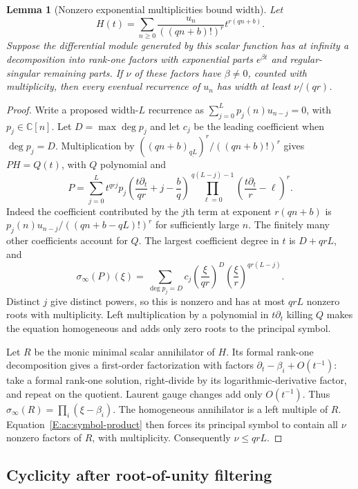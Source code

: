 \documentclass[11pt,a4paper]{article}
\newtheorem{lemma}[theorem]{Lemma}
\theoremstyle{definition}
\theoremstyle{remark}
\numberwithin{equation}{section}
\begin{document}
\begin{lemma}[Nonzero exponential multiplicities bound width]
\label{E:ac:budget}
Let
\[
 H(t)=\sum_{n\ge0}\frac{u_n}{((qn+b)!)^r}t^{r(qn+b)}.
\]
Suppose the differential module generated by this scalar function has
at infinity a decomposition into rank-one factors with exponential
parts $e^{\beta t}$ and regular-singular remaining parts. If $\nu$
of these factors have $\beta\ne0$, counted with multiplicity, then
every eventual recurrence of $u_n$ has width at least $\nu/(qr)$.
\end{lemma}
\begin{proof}
Write a proposed width-$L$ recurrence as
$\sum_{j=0}^L p_j(n)u_{n-j}=0$, with $p_j\in\mathbb C[n]$.
Let $D=\max\deg p_j$ and let $c_j$ be the leading coefficient when
$\deg p_j=D$. Multiplication by
$((qn+b)_{\underline{qL}})^r/((qn+b)!)^r$ gives
$PH=Q(t)$, with $Q$ polynomial and
\[
 P=\sum_{j=0}^L t^{qrj}
 p_j\left(\frac{t\partial_t}{qr}+j-\frac bq\right)
 \prod_{\ell=0}^{q(L-j)-1}
       \left(\frac{t\partial_t}{r}-\ell\right)^r.
\]
Indeed the coefficient contributed by the $j$th term at exponent
$r(qn+b)$ is $p_j(n)u_{n-j}/((qn+b-qL)!)^r$ for sufficiently
large $n$. The finitely many other coefficients account for $Q$.
The largest coefficient degree in $t$ is $D+qrL$, and
\begin{equation}\label{E:ac:symbol}
 \sigma_\infty(P)(\xi)
 =\sum_{\deg p_j=D}c_j
       \left(\frac\xi{qr}\right)^D
       \left(\frac\xi r\right)^{qr(L-j)}.
\end{equation}
Distinct $j$ give distinct powers, so this is nonzero and has at most
$qrL$ nonzero roots with multiplicity. Left multiplication by a
polynomial in $t\partial_t$ killing $Q$ makes the equation homogeneous
and adds only zero roots to the principal symbol.

Let $R$ be the monic minimal scalar annihilator of $H$. Its formal
rank-one decomposition gives a first-order factorization with factors
$\partial_t-\beta_i+O(t^{-1})$: take a formal rank-one solution,
right-divide by its logarithmic-derivative factor, and repeat on the
quotient. Laurent gauge changes add only $O(t^{-1})$.
Thus $\sigma_\infty(R)=\prod_i(\xi-\beta_i)$.
The homogeneous annihilator is a left multiple of $R$.
Equation~\eqref{E:ac:symbol-product} then forces its principal symbol
to contain all $\nu$ nonzero factors of $R$, with multiplicity.
Consequently $\nu\le qrL$.
\end{proof}

\subsection{Cyclicity after root-of-unity filtering}
\end{document}
